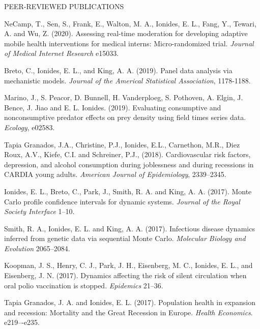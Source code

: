 \begin{reflist}{PEER-REVIEWED PUBLICATIONS}
\item NeCamp, T., Sen, S., Frank, E., Walton, M. A., Ionides, E. L., Fang, Y., Tewari, A. and Wu, Z. (2020). Assessing real-time moderation for developing adaptive mobile health interventions for medical interns: Micro-randomized trial.
  {\it Journal of Medical Internet Research} {}{\separator}e15033.
  
\item Breto, C., Ionides, E. L., and King, A. A. (2019). Panel data analysis via mechanistic models. {\it Journal of the Americal Statistical Association}, {}{\separator}1178-1188.

\item Marino, J., S. Peacor, D. Bunnell, H. Vanderploeg, S. Pothoven, A. Elgin, J. Bence, J. Jiao and E. L. Ionides. (2019). Evaluating consumptive and nonconsumptive predator effects on prey density using field times series data. {\it Ecology}, {}{\separator}e02583.

\item Tapia Granados, J.A., Christine, P.J., Ionides, E.L., Carnethon, M.R., Diez Roux, A.V., Kiefe, C.I. and Schreiner, P.J., (2018). Cardiovascular risk factors, depression, and alcohol consumption during joblessness and during recessions in CARDIA young adults. 
  {\it American Journal of Epidemiology}, {}{\separator}2339--2345.

\item Ionides, E. L., Breto, C., Park, J., Smith, R. A. and King, A. A. (2017). Monte Carlo profile confidence intervals for dynamic systems. {\it Journal of the Royal Society Interface} {}{\separator}1--10.

\item Smith, R. A., Ionides, E. L. and King, A. A. (2017). Infectious disease dynamics inferred from genetic data via sequential Monte Carlo. {\it Molecular Biology and Evolution} {}{\separator}2065--2084.

\item Koopman, J. S., Henry, C. J., Park, J. H., Eisenberg, M. C., Ionides, E. L., and Eisenberg, J. N. (2017). Dynamics affecting the risk of silent circulation when oral polio vaccination is stopped. {\it Epidemics} {}{\separator}21--36. 

\item Tapia Granados, J. A. and Ionides, E. L. (2017). Population health in expansion and recession: Mortality and the Great Recession in Europe. {\it Health Economics}. {}{\separator}e219–-e235.


\end{reflist}
